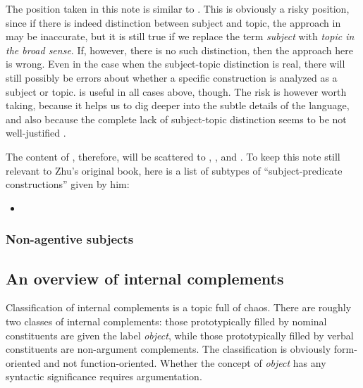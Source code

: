 \documentclass[UTF8, a4paper, oneside, scheme=plain]{ctexart}
\newcommand*{\citechap}[1]{chap.~{#1}}
\newcommand*{\term}[1]{\emph{#1}}
\begin{document}
The position taken in this note is similar to \citet{huang2016reference}.
This is obviously a risky position,
since if there is indeed distinction between subject and topic, 
the approach in \citet{zhudexigrammar} may be inaccurate,
but it is still true if we replace the term \term{subject} with \term{topic in the broad sense}.
If, however, there is no such distinction,
then the approach here is wrong.
Even in the case when the subject-topic distinction is real,
there will still possibly be errors about 
whether a specific construction is
analyzed as a subject or topic.
\citet{zhudexigrammar} is useful in all cases above, though.
The risk is however worth taking, 
because it helps us to dig deeper into the subtle details of the language,
and also because the complete lack of subject-topic distinction 
seems to be not well-justified \citep{sih2000topic}.

The content of \citet[\citechap{7}]{zhudexigrammar},
therefore, will be scattered to 
, , and . 
To keep this note still relevant to Zhu's original book,
here is a list of subtypes of ``subject-predicate constructions'' given by him:
\begin{itemize}
    \item 
\end{itemize}

\subsubsection{Non-agentive subjects}

\subsection{An overview of internal complements}



Classification of internal complements is a topic full of chaos.
There are roughly two classes of internal complements:
those prototypically filled by nominal constituents are given the label \term{object},
while those prototypically filled by verbal constituents are non-argument complements.
The classification is obviously form-oriented and not function-oriented.
Whether the concept of \term{object} has any syntactic significance requires argumentation. %
\end{document}
